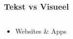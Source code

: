 \documentclass[presentatie.tex]{subfiles}
\begin{document}
    \begin{frame}
        \frametitle{Tekst vs Visueel}

        

        \begin{columns}
            \begin{column}[t]{0.35\textwidth}
                            
                            
                            
                            


                            
                \begin{itemize}
                    \item Websites \& Apps
                            
                    
                    


                    

\end{itemize}
\end{column}
\end{columns}
\end{frame}
\end{document}
